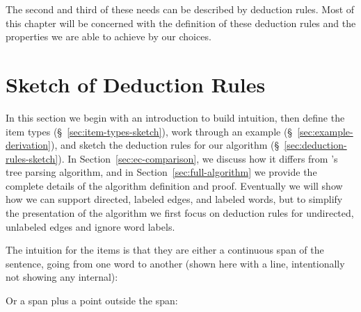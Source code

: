 The second and third of these needs can be described by deduction rules.
Most of this chapter will be concerned with the definition of these deduction rules and the properties we are able to achieve by our choices.

\section{Sketch of Deduction Rules} \label{sec:sketch-of-rules}

\newlength\vertSmall
\newlength\vertBig
\newlength\vertBigger
\newlength{}
\newlength\coordGap

In this section we begin with an introduction to build intuition, then define the item types (\S~\ref{sec:item-types-sketch}), work through an example (\S~\ref{sec:example-derivation}), and sketch the deduction rules for our algorithm (\S~\ref{sec:deduction-rules-sketch}).
In Section~\ref{sec:ec-comparison}, we discuss how it differs from \textcite{ec}'s tree parsing algorithm, and in Section~\ref{sec:full-algorithm} we provide the complete details of the algorithm definition and proof.
Eventually we will show how we can support directed, labeled edges, and labeled words, but to simplify the presentation of the algorithm we first focus on deduction rules for undirected, unlabeled edges and ignore word labels. \\

\noindent
\parbox{4in}{
The intuition for the items is that they are either a continuous span of the sentence, going from one word to another (shown here with a line, intentionally not showing any internal): \\
}\hfill{}\hfill\strut

\noindent
\parbox{4in}{
Or a span plus a point outside the span: \\
}\hfill{}\hfill\strut


